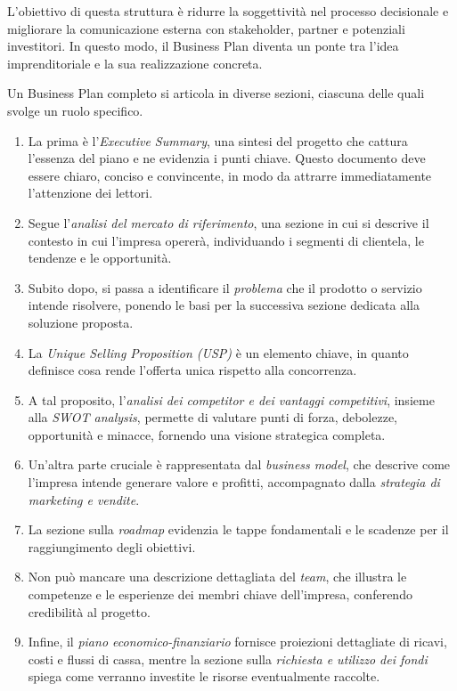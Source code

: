 L'obiettivo di questa struttura è ridurre la soggettività nel processo decisionale e migliorare la comunicazione esterna con stakeholder, partner e potenziali investitori. In questo modo, il Business Plan diventa un ponte tra l’idea imprenditoriale e la sua realizzazione concreta.

Un Business Plan completo si articola in diverse sezioni, ciascuna delle quali svolge un ruolo specifico. 
\begin{enumerate}
    \item La prima è l’\textit{Executive Summary}, una sintesi del progetto che cattura l’essenza del piano e ne evidenzia i punti chiave. Questo documento deve essere chiaro, conciso e convincente, in modo da attrarre immediatamente l’attenzione dei lettori.
    \item Segue l’\textit{analisi del mercato di riferimento}, una sezione in cui si descrive il contesto in cui l’impresa opererà, individuando i segmenti di clientela, le tendenze e le opportunità. 
    \item Subito dopo, si passa a identificare il \textit{problema} che il prodotto o servizio intende risolvere, ponendo le basi per la successiva sezione dedicata alla soluzione proposta.
    \item La \textit{Unique Selling Proposition (USP)} è un elemento chiave, in quanto definisce cosa rende l’offerta unica rispetto alla concorrenza. 
    \item A tal proposito, l’\textit{analisi dei competitor e dei vantaggi competitivi}, insieme alla \textit{SWOT analysis}, permette di valutare punti di forza, debolezze, opportunità e minacce, fornendo una visione strategica completa.
    \item Un’altra parte cruciale è rappresentata dal \textit{business model}, che descrive come l’impresa intende generare valore e profitti, accompagnato dalla \textit{strategia di marketing e vendite}. 
    \item La sezione sulla \textit{roadmap} evidenzia le tappe fondamentali e le scadenze per il raggiungimento degli obiettivi.
    \item Non può mancare una descrizione dettagliata del \textit{team}, che illustra le competenze e le esperienze dei membri chiave dell’impresa, conferendo credibilità al progetto. 
    \item Infine, il \textit{piano economico-finanziario} fornisce proiezioni dettagliate di ricavi, costi e flussi di cassa, mentre la sezione sulla \textit{richiesta e utilizzo dei fondi} spiega come verranno investite le risorse eventualmente raccolte.
\end{enumerate}

